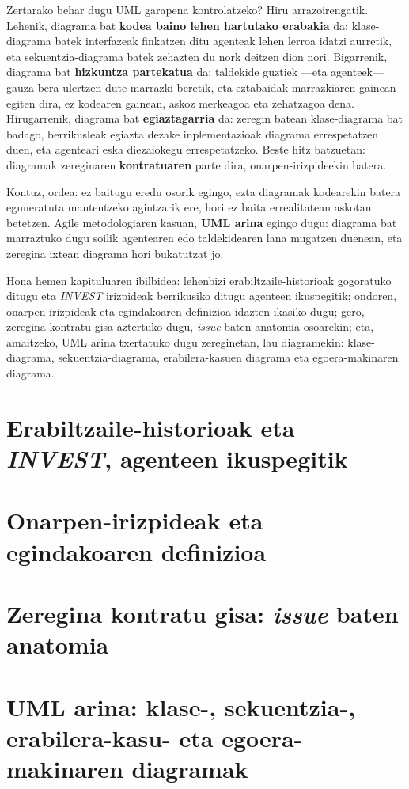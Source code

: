 Zertarako behar dugu UML garapena kontrolatzeko?
Hiru arrazoirengatik.
Lehenik, diagrama bat \textbf{kodea baino lehen hartutako erabakia} da: klase-diagrama batek interfazeak finkatzen ditu agenteak lehen lerroa idatzi aurretik, eta sekuentzia-diagrama batek zehazten du nork deitzen dion nori.
Bigarrenik, diagrama bat \textbf{hizkuntza partekatua} da: taldekide guztiek ---eta agenteek--- gauza bera ulertzen dute marrazki beretik, eta eztabaidak marrazkiaren gainean egiten dira, ez kodearen gainean, askoz merkeagoa eta zehatzagoa dena.
Hirugarrenik, diagrama bat \textbf{egiaztagarria} da: zeregin batean klase-diagrama bat badago, berrikusleak egiazta dezake inplementazioak diagrama errespetatzen duen, eta agenteari eska diezaiokegu errespetatzeko.
Beste hitz batzuetan: diagramak zereginaren \textbf{kontratuaren} parte dira, onarpen-irizpideekin batera.

Kontuz, ordea: ez baitugu eredu osorik egingo, ezta diagramak kodearekin batera eguneratuta mantentzeko agintzarik ere, hori ez baita errealitatean askotan betetzen.
Agile metodologiaren kasuan, \textbf{UML arina} egingo dugu: diagrama bat marraztuko dugu soilik agentearen edo taldekidearen lana mugatzen duenean, eta zeregina ixtean diagrama hori bukatutzat jo.



Hona hemen kapituluaren ibilbidea: lehenbizi erabiltzaile-historioak gogoratuko ditugu eta \textit{INVEST} irizpideak berrikusiko ditugu agenteen ikuspegitik; ondoren, onarpen-irizpideak eta egindakoaren definizioa idazten ikasiko dugu; gero, zeregina kontratu gisa aztertuko dugu, \textit{issue} baten anatomia osoarekin; eta, amaitzeko, UML arina txertatuko dugu zereginetan, lau diagramekin: klase-diagrama, sekuentzia-diagrama, erabilera-kasuen diagrama eta egoera-makinaren diagrama.

\section{Erabiltzaile-historioak eta \textit{INVEST}, agenteen ikuspegitik}

\section{Onarpen-irizpideak eta egindakoaren definizioa}

\section{Zeregina kontratu gisa: \textit{issue} baten anatomia}

\section{UML arina: klase-, sekuentzia-, erabilera-kasu- eta egoera-makinaren diagramak}
